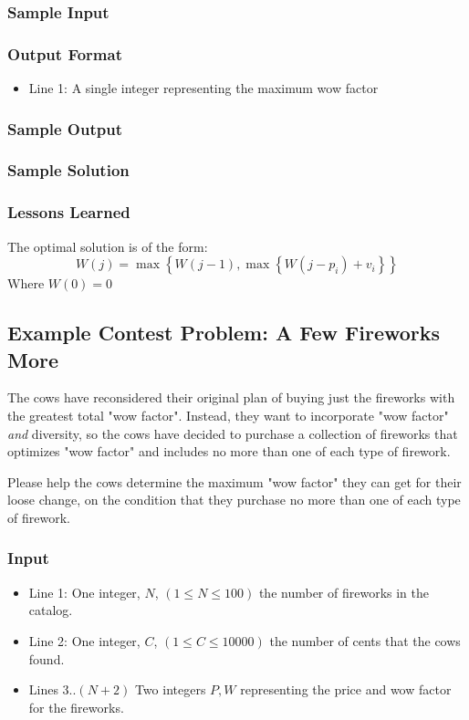 \subsubsection{Sample Input}


\subsubsection{Output Format}
\begin{itemize}
	\item Line 1: A single integer representing the maximum wow factor
\end{itemize}
\subsubsection{Sample Output}


\subsubsection{Sample Solution}


\subsubsection{Lessons Learned}
The optimal solution is of the form:
$$W(j) = \max \left\{W(j-1), \max \left\{W(j - p_i) + v_i \right\}\right\}$$
Where $W(0) = 0$

\subsection{Example Contest Problem: A Few Fireworks More}
The cows have reconsidered their original plan of buying just the fireworks with the greatest total "wow factor".
Instead, they want to incorporate "wow factor" \emph{and} diversity, so the cows have decided to purchase a collection of fireworks that optimizes "wow factor" and includes no more than one of each type of firework.

Please help the cows determine the maximum "wow factor" they can get for their loose change, on the condition that they purchase no more than one of each type of firework.

\subsubsection{Input}
\begin{itemize}
	\item Line 1: One integer, $N$, $(1 \leq N \leq 100)$ the number of fireworks in the catalog.
	\item Line 2: One integer, $C$, $(1 \leq C \leq 10000)$ the number of cents that the cows found.
	\item Lines 3..$(N+2)$ Two integers $P,W$ representing the price and wow factor for the fireworks.
\end{itemize}


